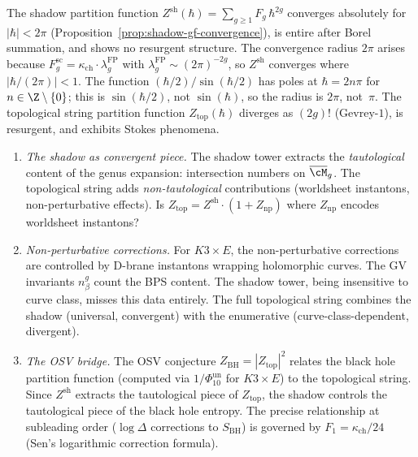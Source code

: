 \begin{openproblem}
\label{op:programme-j-convergence}
The shadow partition function $Z^{\mathrm{sh}}(\hbar) =
\sum_{g \geq 1} F_g\,\hbar^{2g}$ converges absolutely for
$|\hbar| < 2\pi$ (Proposition~\ref{prop:shadow-gf-convergence}),
is entire after Borel summation, and shows no resurgent
structure. The convergence radius $2\pi$ arises because
$F_g^{\mathrm{sc}} = \kappa_{\mathrm{ch}} \cdot \lambda_g^{\mathrm{FP}}$ with
$\lambda_g^{\mathrm{FP}} \sim (2\pi)^{-2g}$, so
$Z^{\mathrm{sh}}$ converges where $|\hbar/(2\pi)| < 1$.
The function $(\hbar/2)/\sin(\hbar/2)$ has poles at
$\hbar = 2n\pi$ for $n \in \Z \setminus \{0\}$; this is
$\sin(\hbar/2)$, not $\sin(\hbar)$, so the radius is
$2\pi$, not~$\pi$.
The topological string partition function
$Z_{\mathrm{top}}(\hbar)$ diverges as $(2g)!$ (Gevrey-$1$),
is resurgent, and exhibits Stokes phenomena.
\begin{enumerate}[label=\textup{(\roman*)}]
\item \emph{The shadow as convergent piece.}
 The shadow tower extracts the \emph{tautological}
 content of the genus expansion: intersection numbers on
 $\overline{\cM}_g$. The topological string adds
 \emph{non-tautological} contributions (worldsheet
 instantons, non-perturbative effects). Is
 $Z_{\mathrm{top}} = Z^{\mathrm{sh}} \cdot (1 +
 Z_{\mathrm{np}})$ where $Z_{\mathrm{np}}$ encodes
 worldsheet instantons?
\item \emph{Non-perturbative corrections.} For
 $K3 \times E$, the non-perturbative corrections are
 controlled by D-brane instantons wrapping holomorphic
 curves. The GV invariants $n^g_\beta$ count the
 BPS content. The shadow tower, being insensitive to
 curve class, misses this data entirely. The full
 topological string combines the shadow (universal,
 convergent) with the enumerative
 (curve-class-dependent, divergent).
\item \emph{The OSV bridge.}
 The OSV conjecture $Z_{\mathrm{BH}} = |Z_{\mathrm{top}}|^2$
 relates the black hole partition function (computed via
 \(1/\Phi_{10}^{\mathrm{un}}\) for \(K3 \times E\)) to the topological
 string. Since $Z^{\mathrm{sh}}$ extracts the
 tautological piece of $Z_{\mathrm{top}}$, the shadow
 controls the tautological piece of the black hole entropy.
 The precise relationship at subleading order ($\log\Delta$
 corrections to $S_{\mathrm{BH}}$) is governed by
 $F_1 = \kappa_{\mathrm{ch}}/24$ (Sen's logarithmic correction
 formula).
\end{enumerate}
\end{openproblem}


